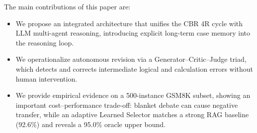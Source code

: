 The main contributions of this paper are:
\begin{itemize}
  \item We propose an integrated architecture that unifies the CBR 4R cycle with LLM multi-agent reasoning, introducing explicit long-term case memory into the reasoning loop.
  \item We operationalize autonomous revision via a Generator--Critic--Judge triad, which detects and corrects intermediate logical and calculation errors without human intervention.
  \item We provide empirical evidence on a 500-instance GSM8K subset, showing an important cost--performance trade-off: blanket debate can cause negative transfer, while an adaptive Learned Selector matches a strong RAG baseline (92.6\%) and reveals a 95.0\% oracle upper bound.
\end{itemize}
